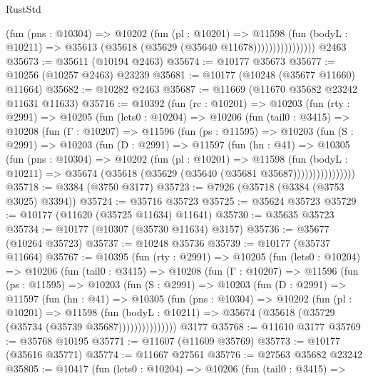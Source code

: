 \begin{lexlean}{RustStd}
\begin{coremodule}
                        (fun (pns : @10304) =>
                        @10202
                          (fun (pl : @10201) =>
                          @11598
                            (fun (bodyL : @10211) =>
                            @35613 (@35618 (@35629 (@35640 @11678))))))))))))))))
    @2463
@35673 := @35611 (@10194 @2463)
@35674 := @10177 @35673
@35677 := @10256 (@10257 @2463) @23239
@35681 := @10177 (@10248 (@35677 @11660) @11664)
@35682 := @10282 @2463
@35687 := @11669 (@11670 @35682 @23242 @11631 @11633)
@35716 := @10392
    (fun (rc : @10201) =>
    @10203
      (fun (rty : @2991) =>
      @10205
        (fun (lets0 : @10204) =>
        @10206
          (fun (tail0 : @3415) =>
          @10208
            (fun (Γ : @10207) =>
            @11596
              (fun (ps : @11595) =>
              @10203
                (fun (S : @2991) =>
                @10203
                  (fun (D : @2991) =>
                  @11597
                    (fun (hn : @41) =>
                    @10305
                      (fun (pns : @10304) =>
                      @10202
                        (fun (pl : @10201) =>
                        @11598
                          (fun (bodyL : @10211) =>
                          @35674 (@35618 (@35629 (@35640 (@35681 @35687))))))))))))))))
@35718 := @3384 (@3750 @3177)
@35723 := @7926 (@35718 (@3384 (@3753 @3025) @3394))
@35724 := @35716 @35723
@35725 := @35624 @35723
@35729 := @10177 (@11620 (@35725 @11634) @11641)
@35730 := @35635 @35723
@35734 := @10177 (@10307 (@35730 @11634) @3157)
@35736 := @35677 (@10264 @35723)
@35737 := @10248 @35736
@35739 := @10177 (@35737 @11664)
@35767 := @10395
    (fun (rty : @2991) =>
    @10205
      (fun (lets0 : @10204) =>
      @10206
        (fun (tail0 : @3415) =>
        @10208
          (fun (Γ : @10207) =>
          @11596
            (fun (ps : @11595) =>
            @10203
              (fun (S : @2991) =>
              @10203
                (fun (D : @2991) =>
                @11597
                  (fun (hn : @41) =>
                  @10305
                    (fun (pns : @10304) =>
                    @10202
                      (fun (pl : @10201) =>
                      @11598
                        (fun (bodyL : @10211) =>
                        @35674 (@35618 (@35729 (@35734 (@35739 @35687)))))))))))))))
    @3177
@35768 := @11610 @3177
@35769 := @35768 @10195
@35771 := @11607 (@11609 @35769)
@35773 := @10177 (@35616 @35771)
@35774 := @11667 @27561
@35776 := @27563 @35682 @23242
@35805 := @10417
    (fun (lets0 : @10204) =>
    @10206
      (fun (tail0 : @3415) =>

\end{coremodule}
\end{lexlean}
